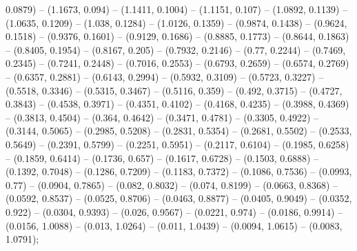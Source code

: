 0.0879) -- (1.1673, 0.094) -- (1.1411, 0.1004) -- (1.1151, 0.107) -- (1.0892, 0.1139) -- (1.0635, 0.1209) -- (1.038, 0.1284) -- (1.0126, 0.1359) -- (0.9874, 0.1438) -- (0.9624, 0.1518) -- (0.9376, 0.1601) -- (0.9129, 0.1686) -- (0.8885, 0.1773) -- (0.8644, 0.1863) -- (0.8405, 0.1954) -- (0.8167, 0.205) -- (0.7932, 0.2146) -- (0.77, 0.2244) -- (0.7469, 0.2345) -- (0.7241, 0.2448) -- (0.7016, 0.2553) -- (0.6793, 0.2659) -- (0.6574, 0.2769) -- (0.6357, 0.2881) -- (0.6143, 0.2994) -- (0.5932, 0.3109) -- (0.5723, 0.3227) -- (0.5518, 0.3346) -- (0.5315, 0.3467) -- (0.5116, 0.359) -- (0.492, 0.3715) -- (0.4727, 0.3843) -- (0.4538, 0.3971) -- (0.4351, 0.4102) -- (0.4168, 0.4235) -- (0.3988, 0.4369) -- (0.3813, 0.4504) -- (0.364, 0.4642) -- (0.3471, 0.4781) -- (0.3305, 0.4922) -- (0.3144, 0.5065) -- (0.2985, 0.5208) -- (0.2831, 0.5354) -- (0.2681, 0.5502) -- (0.2533, 0.5649) -- (0.2391, 0.5799) -- (0.2251, 0.5951) -- (0.2117, 0.6104) -- (0.1985, 0.6258) -- (0.1859, 0.6414) -- (0.1736, 0.657) -- (0.1617, 0.6728) -- (0.1503, 0.6888) -- (0.1392, 0.7048) -- (0.1286, 0.7209) -- (0.1183, 0.7372) -- (0.1086, 0.7536) -- (0.0993, 0.77) -- (0.0904, 0.7865) -- (0.082, 0.8032) -- (0.074, 0.8199) -- (0.0663, 0.8368) -- (0.0592, 0.8537) -- (0.0525, 0.8706) -- (0.0463, 0.8877) -- (0.0405, 0.9049) -- (0.0352, 0.922) -- (0.0304, 0.9393) -- (0.026, 0.9567) -- (0.0221, 0.974) -- (0.0186, 0.9914) -- (0.0156, 1.0088) -- (0.013, 1.0264) -- (0.011, 1.0439) -- (0.0094, 1.0615) -- (0.0083, 1.0791);




